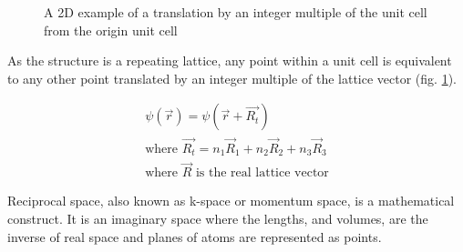 \begin{figure}[htbp]
\begin{center}
\begin{minipage}{.47\textwidth}
\caption{A 2D example of a translation by an integer multiple of the unit cell from the origin unit cell}
\label{image:2dtranslation}

\end{minipage}
\end{center}
\end{figure}




\FloatBarrier
As the structure is a repeating lattice, any point within a unit cell is equivalent to any other point translated by an integer multiple of the lattice vector (fig. \ref{image:2dtranslation}).

\begin{equation}
  \begin{split}
    \psi(\vec{r}) = \psi(\vec{r} + \vec{R_t}) \\
    \text{where } \vec{R_t} = n_1 \vec{R}_{1} + n_2 \vec{R}_{2} + n_3 \vec{R}_{3} \\
    \text{where } \vec{R} \text{ is the real lattice vector}
  \end{split}
  \label{eq:eqEulersFormula}
\end{equation}


Reciprocal space, also known as k-space or momentum space, is a mathematical construct.  It is an imaginary space where the lengths, and volumes, are the inverse of real space and planes of atoms are represented as points. 

